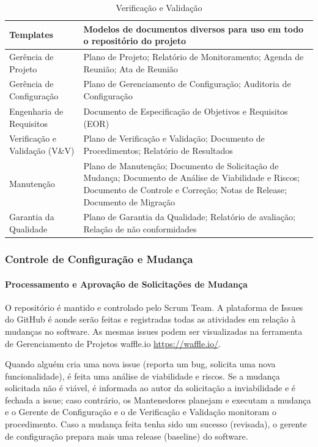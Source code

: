    \begin{table}[H]
      \begin{center}
        \begin{tabular}{| l | p{6cm} |}
        \hline
        \textbf{Templates} & \textbf{Modelos de documentos diversos para uso em todo o repositório do projeto} \\ \hline
        Gerência de Projeto & Plano de Projeto; Relatório de Monitoramento; Agenda de Reunião; Ata de Reunião \\ \hline
        Gerência de Configuração & Plano de Gerenciamento de Configuração; Auditoria de Configuração \\ \hline
        Engenharia de Requisitos & Documento de Especificação de Objetivos e Requisitos (EOR) \\ \hline
        Verificação e Validação (V\&V) & Plano de Verificação e Validação; Documento de Procedimentos; Relatório de Resultados \\ \hline
        Manutenção & Plano de Manutenção; Documento de Solicitação de Mudança; Documento de Análise de Viabilidade e Riscos; Documento de Controle e Correção; Notas de Release; Documento de Migração \\ \hline
        Garantia da Qualidade & Plano de Garantia da Qualidade; Relatório de avaliação; Relação de não conformidades \\ \hline
        \end{tabular}
      \end{center}
    \caption{Verificação e Validação}
    \end{table}

\subsubsection{Controle de Configuração e Mudança}

\paragraph{Processamento e Aprovação de Solicitações de Mudança}

O repositório é mantido e controlado pelo Scrum Team. A plataforma de Issues do GitHub é aonde serão feitas e registradas todas as atividades em relação à mudanças no software. As mesmas issues podem ser visualizadas na ferramenta de Gerenciamento de Projetos waffle.io \url{https://waffle.io/}.

Quando alguém cria uma nova issue (reporta um bug, solicita uma nova funcionalidade), é feita uma análise de viabilidade e riscos. Se a mudança solicitada não é viável, é informada ao autor da solicitação a inviabilidade e é fechada a issue; caso contrário, os Mantenedores planejam e executam a mudança e o Gerente de Configuração e o de Verificação e Validação monitoram o procedimento. Caso a mudança feita tenha sido um sucesso (revisada), o gerente de configuração prepara mais uma release (baseline) do software.


